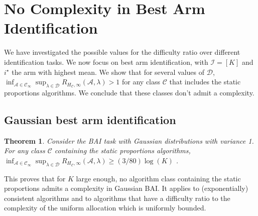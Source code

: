 \documentclass{article}
\newtheorem{theorem}{Theorem}
\begin{document}
\section{No Complexity in Best Arm Identification}
\label{sec:no_complexity_in_best_arm_identification}

We have investigated the possible values for the difficulty ratio over different identification tasks. We now focus on best arm identification, with $\mathcal I = [K]$ and $i^\star$ the arm with highest mean. We show that for several values of $\mathcal D$, $\inf_{\mathcal A \in \mathcal C_{\infty}}\sup_{\lambda \in \mathcal D} R_{H_{\mathcal C}, \infty}(\mathcal A, \lambda) > 1$ for any class $\mathcal C$ that includes the static proportions algorithms. We conclude that these classes don't admit a complexity.

\subsection{Gaussian best arm identification}
\label{sub:gaussian_best_arm_identification}

\begin{theorem}\label{thm:gaussian_bai_no_complexity}
Consider the BAI task with Gaussian distributions with variance 1.
For any class $\mathcal C$ containing the static proportions algorithms,
$\inf_{\mathcal A \in \mathcal C_\infty} \sup_{\lambda \in \mathcal D} R_{H_{\mathcal C},\infty}(\mathcal A, \lambda)
\ge (3/80)\log(K)$ .
\end{theorem}

This proves that for $K$ large enough, no algorithm class containing the static proportions admits a complexity in Gaussian BAI. It applies to (exponentially) consistent algorithms and to algorithms that have a difficulty ratio to the complexity of the uniform allocation which is uniformly bounded.
\end{document}

